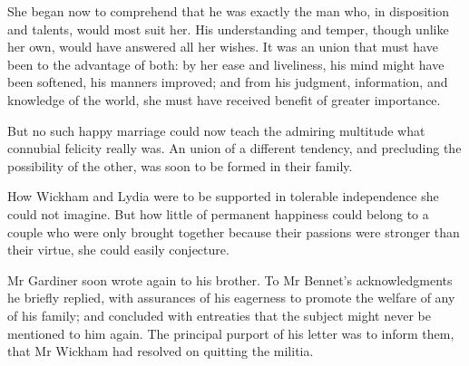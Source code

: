 She began now to comprehend that he was exactly the man who, in disposition and talents, would most suit her. His understanding and temper, though unlike her own, would have answered all her wishes. It was an union that must have been to the advantage of both: by her ease and liveliness, his mind might have been softened, his manners improved; and from his judgment, information, and knowledge of the world, she must have received benefit of greater importance.

But no such happy marriage could now teach the admiring multitude what connubial felicity really was. An union of a different tendency, and precluding the possibility of the other, was soon to be formed in their family.

How Wickham and Lydia were to be supported in tolerable independence she could not imagine. But how little of permanent happiness could belong to a couple who were only brought together because their passions were stronger than their virtue, she could easily conjecture.

Mr Gardiner soon wrote again to his brother. To Mr Bennet's acknowledgments he briefly replied, with assurances of his eagerness to promote the welfare of any of his family; and concluded with entreaties that the subject might never be mentioned to him again. The principal purport of his letter was to inform them, that Mr Wickham had resolved on quitting the militia.


